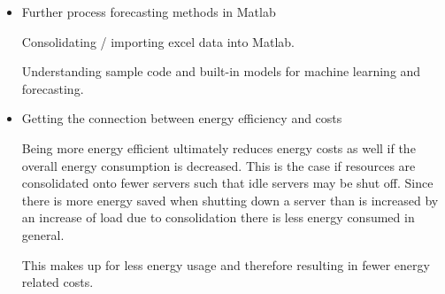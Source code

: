 \documentclass[a4paper]{article}
\begin{document}
\begin{itemize}
\item Further process forecasting methods in Matlab

Consolidating / importing excel data into Matlab. 

Understanding sample code and built-in models for machine learning and forecasting. 

\item Getting the connection between energy efficiency and costs

Being more energy efficient ultimately reduces energy costs as well if the overall 
energy consumption is decreased. This is the case if resources are consolidated onto
fewer servers such that idle servers may be shut off. Since there is more energy saved
when shutting down a server than is increased by an increase of load due to consolidation
there is less energy consumed in general. 

This makes up for less energy usage and therefore resulting in fewer energy related costs. 

\end{itemize}
\end{document}
